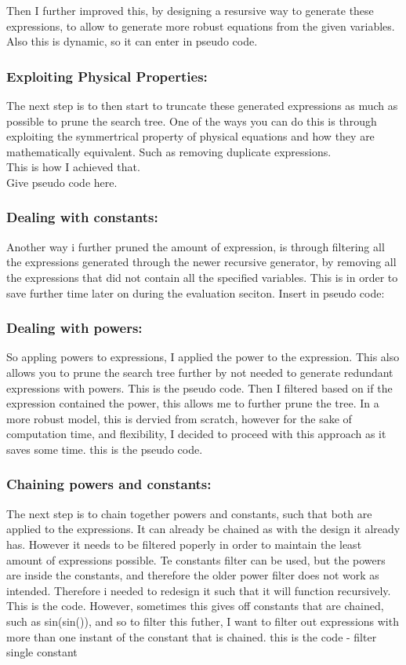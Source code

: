 \documentclass{article}
\begin{document}
Then I further improved this, by designing a resursive way to generate these expressions, to allow to generate
more robust equations from the given variables. Also this is dynamic, so it can
enter in pseudo code.\\

\subsubsection{ Exploiting Physical Properties: }

The next step is to then start to truncate these generated expressions as much as possible to prune the search
tree. One of the ways you can do this is through exploiting the symmertrical property of physical equations and
how they are mathematically equivalent. Such as removing duplicate expressions.\\
This is how I achieved that.\\
Give pseudo code here.\\

\subsubsection{Dealing with constants:}

Another way i further pruned the amount of expression, is through filtering all the expressions generated through
the newer recursive generator, by removing all the expressions that did not contain all the specified variables.
This is in order to save further time later on during the evaluation seciton.
Insert in pseudo code:

\subsubsection{Dealing with powers:}
So appling powers to expressions, I applied the power to the expression. This also allows you to prune the
search tree further by not needed to generate redundant expressions with powers.
This is the pseudo code.
Then I filtered based on if the expression contained the power, this allows me to further prune the tree. In a more
robust model, this is dervied from scratch, however for the sake of computation time, and flexibility, I decided
to proceed with this approach as it saves some time.
this is the pseudo code.
\subsubsection{Chaining powers and constants:}
The next step is to chain together powers and constants, such that both are applied to the expressions. It can
already be chained as with the design it already has. However it needs to be filtered poperly in order to maintain
the least amount of expressions possible.
Te constants filter can be used, but the powers are inside the constants, and therefore the older power filter does
not work as intended. Therefore i needed to redesign it such that it will function recursively.
This is the code.
However, sometimes this gives off constants that are chained, such as sin(sin()), and so to filter this futher, I
want to filter out expressions with more than one instant of the constant that is chained.
this is the code - filter single constant
\end{document}
